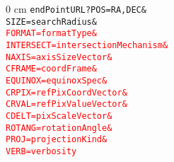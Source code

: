 	\begin{adjustwidth}{\parindent}{0 cm}
		\texttt{endPointURL?POS=RA,DEC\&\\
				SIZE=searchRadius\&\\
				\textcolor{red}{FORMAT=formatType\&}\\
				\textcolor{red}{INTERSECT=intersectionMechanism\&}\\
				\textcolor{red}{NAXIS=axisSizeVector\&}\\
				\textcolor{red}{CFRAME=coordFrame\&}\\
				\textcolor{red}{EQUINOX=equinoxSpec\&}\\
				\textcolor{red}{CRPIX=refPixCoordVector\&}\\
				\textcolor{red}{CRVAL=refPixValueVector\&}\\
				\textcolor{red}{CDELT=pixScaleVector\&}\\
				\textcolor{red}{ROTANG=rotationAngle\&}\\
				\textcolor{red}{PROJ=projectionKind\&}\\
				\textcolor{red}{VERB=verbosity}}
	\end{adjustwidth}
			
	
